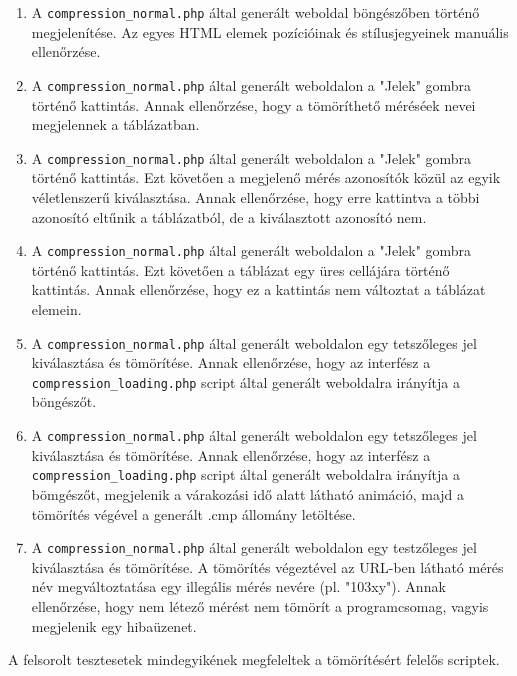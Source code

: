 \documentclass[oneside,titlepage,12pt,a4paper]{report}
\begin{document}
\begin{enumerate}
\item A \texttt{compression\_normal.php} által generált weboldal böngészőben történő megjelenítése. Az egyes HTML elemek pozícióinak és stílusjegyeinek manuális ellenőrzése.
\item A \texttt{compression\_normal.php} által generált weboldalon a "Jelek" gombra történő kattintás. Annak ellenőrzése, hogy a tömöríthető méréséek nevei megjelennek a táblázatban.
\item A \texttt{compression\_normal.php} által generált weboldalon a "Jelek" gombra történő kattintás. Ezt követően a megjelenő mérés azonosítók közül az egyik véletlenszerű kiválasztása. Annak ellenőrzése, hogy erre kattintva a többi azonosító eltűnik a táblázatból, de a kiválasztott azonosító nem.
\item A \texttt{compression\_normal.php} által generált weboldalon a "Jelek" gombra történő kattintás. Ezt követően a táblázat egy üres cellájára történő kattintás. Annak ellenőrzése, hogy ez a kattintás nem változtat a táblázat elemein.
\item A \texttt{compression\_normal.php} által generált weboldalon egy tetszőleges jel kiválasztása és tömörítése. Annak ellenőrzése, hogy az interfész a \linebreak \texttt{compression\_loading.php} script által generált weboldalra irányítja a böngészőt.

\item A \texttt{compression\_normal.php} által generált weboldalon egy tetszőleges jel kiválasztása és tömörítése. Annak ellenőrzése, hogy az interfész a \linebreak \texttt{compression\_loading.php} script által generált weboldalra irányítja a bömgészőt, megjelenik a várakozási idő alatt látható animáció, majd a tömörítés végével a generált .cmp állomány letöltése. 

\item A \texttt{compression\_normal.php} által generált weboldalon egy testzőleges jel kiválasztása és tömörítése. A tömörítés végeztével az URL-ben látható mérés név megváltoztatása egy illegális mérés nevére (pl. "103xy"). Annak ellenőrzése, hogy nem létező mérést nem tömörít a programcsomag, vagyis megjelenik egy hibaüzenet.

\end{enumerate}

A felsorolt tesztesetek mindegyikének megfeleltek a tömörítésért felelős scriptek.
\end{document}
